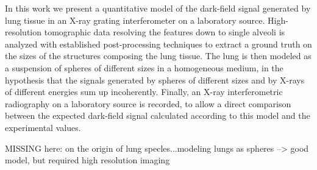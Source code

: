 In this work we present a quantitative model of the dark-field signal
generated by lung tissue in an X-ray grating interferometer on a laboratory
source. High-resolution tomographic data resolving the features down to single
alveoli is analyzed with established post-processing techniques to extract a
ground truth on the sizes of the structures composing the lung tissue. The
lung is then modeled as a suspension of spheres of different sizes in a
homogeneous medium, in the hypothesis that the signals generated by spheres
of different sizes and by X-rays of different energies sum up incoherently.
Finally, an X-ray interferometric radiography on a laboratory source is
recorded, to allow a direct comparison between the expected dark-field
signal calculated according to this model and the experimental values.

MISSING here: \cite{Kitchen2004, Carnibella2012a, Leong2014} on the origin of lung specles...modeling lungs as spheres --> good model, but required high resolution imaging
